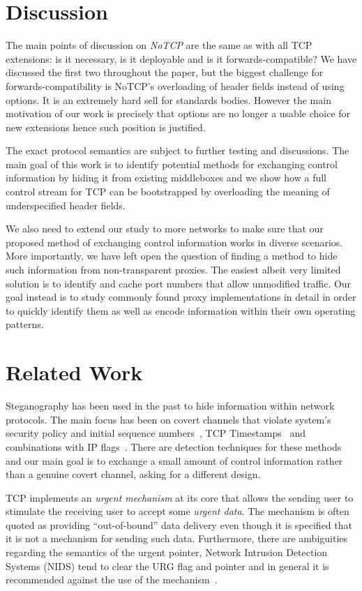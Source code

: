 \documentclass{sig-alternate-10pt}
\begin{document}
\section{Discussion}

The main points of discussion on \emph{NoTCP} are the same as with all TCP extensions: is it necessary, is it deployable and is it forwards-compatible? We have discussed the first two throughout the paper, but the biggest challenge for forwards-compatibility is NoTCP's overloading of header fields instead of using options. It is an extremely hard sell for standards bodies. However the main motivation of our work is precisely that options are no longer a usable choice for new extensions hence such position is justified.

The exact protocol semantics are subject to further testing and discussions. The main goal of this work is to identify potential methods for exchanging control information by hiding it from existing middleboxes and we show how a full control stream for TCP can be bootstrapped by overloading the meaning of underspecified header fields.

We also need to extend our study to more networks to make sure that our proposed method of exchanging control information works in diverse scenarios. More importantly, we have left open the question of finding a method to hide such information from non-transparent proxies. The easiest albeit very limited solution is to identify and cache port numbers that allow unmodified traffic. Our goal instead is to study commonly found proxy implementations in detail in order to quickly identify them as well as encode information within their own operating patterns.

\section{Related Work}
\label{sec:related}

Steganography has been used in the past to hide information within network protocols. The main focus has been on covert channels that violate system's security policy and initial sequence numbers~\cite{Rowland:1997vq}, TCP Timestamps~\cite{Giffin:2002wh} and combinations with IP flags~\cite{Murdoch:2005fz}. There are detection techniques for these methods and our main goal is to exchange a small amount of control information rather than a genuine covert channel, asking for a different design.

TCP implements an \emph{urgent mechanism} at its core that allows the sending user to stimulate the receiving user to accept some \emph{urgent data}. The mechanism is often quoted as providing ``out-of-bound'' data delivery even though it is specified that it is not a mechanism for sending such data. Furthermore, there are ambiguities regarding the semantics of the urgent pointer, Network Intrusion Detection Systems (NIDS) tend to clear the URG flag and pointer and in general it is recommended against the use of the mechanism~\cite{Gont:2011vi}.
\end{document}
